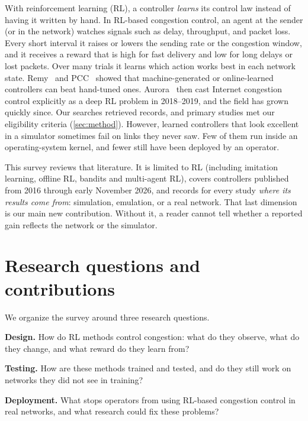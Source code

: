 With reinforcement learning (RL), a controller \emph{learns} its control law instead of having it written by hand. In RL-based congestion control, an agent at the sender (or in the network) watches signals such as delay, throughput, and packet loss. Every short interval it raises or lowers the sending rate or the congestion window, and it receives a reward that is high for fast delivery and low for long delays or lost packets. Over many trials it learns which action works best in each network state. Remy~\cite{winstein2013remy} and PCC~\cite{dong2015pcc,dong2018vivace} showed that machine-generated or online-learned controllers can beat hand-tuned ones. Aurora~\cite{jay2019aurora} then cast Internet congestion control explicitly as a deep RL problem in 2018--2019, and the field has grown quickly since. Our searches retrieved \nIdentifiedTotal{} records, and \nStudies{} primary studies met our eligibility criteria (\cref{sec:method}). However, learned controllers that look excellent in a simulator sometimes fail on links they never saw. Few of them run inside an operating-system kernel, and fewer still have been deployed by an operator.

This survey reviews that literature. It is limited to RL (including imitation learning, offline RL, bandits and multi-agent RL), covers controllers published from 2016 through early November 2026, and records for every study \emph{where its results come from}: simulation, emulation, or a real network. That last dimension is our main new contribution. Without it, a reader cannot tell whether a reported gain reflects the network or the simulator.

\section{Research questions and contributions}
\label{sec:rqs}

We organize the survey around three research questions.

\begin{description}[leftmargin=1.2cm,labelwidth=1cm]
  \item[\RQ{1}] \textbf{Design.} How do RL methods control congestion: what do they observe, what do they change, and what reward do they learn from?
  \item[\RQ{2}] \textbf{Testing.} How are these methods trained and tested, and do they still work on networks they did not see in training?
  \item[\RQ{3}] \textbf{Deployment.} What stops operators from using RL-based congestion control in real networks, and what research could fix these problems?
\end{description}

